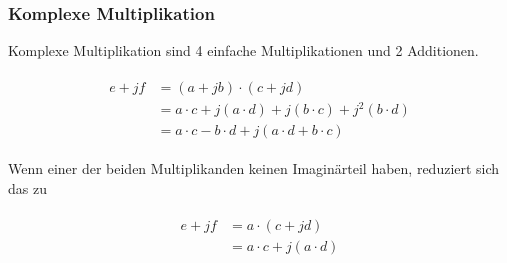 \begin{frame}\frametitle{Komplexe Multiplikation}

Komplexe Multiplikation sind 4 einfache Multiplikationen und 2 Additionen.

 \begin{align*}\label{eq:komplexe_Multiplikation}
\begin{split}
 e + jf &= (a + jb) \cdot (c + jd)\\
        &= a \cdot c + j(a \cdot d) + j(b \cdot c) + j^2(b \cdot d)\\
        &= a \cdot c - b \cdot d + j(a \cdot d + b \cdot c)
\end{split}
  \end{align*}
  
  Wenn einer der beiden Multiplikanden keinen Imaginärteil haben, reduziert sich das zu 

 \begin{align*}\label{eq:halb_komplexe_Multiplikation}
 \begin{split}
  e + jf &= a \cdot (c + jd)\\
         &= a \cdot c + j(a \cdot d)\\
 \end{split}
 \end{align*}
\end{frame}


 



